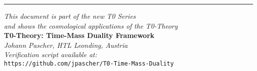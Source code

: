 \documentclass[12pt,a4paper]{article}
\begin{document}
	\begin{center}
		\hrule
		\vspace{0.5cm}
		\textit{This document is part of the new T0 Series}\\
		\textit{and shows the cosmological applications of the T0-Theory}\\
		\vspace{0.3cm}
		\textbf{T0-Theory: Time-Mass Duality Framework}\\
		\textit{Johann Pascher, HTL Leonding, Austria}\\
		\vspace{0.3cm}
		\textit{Verification script available at:}\\
		\texttt{https://github.com/jpascher/T0-Time-Mass-Duality}
	\end{center}
	
\end{document}
